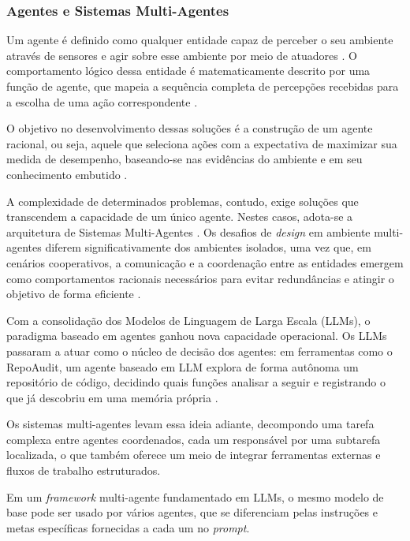 \documentclass[
    12pt,                %
    openright,           %
    oneside,             %
    a4paper,             %
    english,             %
    brazil               %
]{abntex2}
\begin{document}
\subsubsection{Agentes e Sistemas Multi-Agentes}
\label{sec:agentes}
\par
Um agente é definido como qualquer entidade capaz de perceber o seu ambiente através de sensores e agir sobre esse ambiente por meio de atuadores \cite{russell2020artificial}.
O comportamento lógico dessa entidade é matematicamente descrito por uma função de agente, que mapeia a sequência completa de percepções recebidas para a escolha de uma ação correspondente \cite{russell2020artificial}.
\par
O objetivo no desenvolvimento dessas soluções é a construção de um agente racional, ou seja, aquele que seleciona ações com a expectativa de maximizar sua medida de desempenho, baseando-se nas evidências do ambiente e em seu conhecimento embutido \cite{russell2020artificial}.
\par
A complexidade de determinados problemas, contudo, exige soluções que transcendem a capacidade de um único agente.
Nestes casos, adota-se a arquitetura de Sistemas Multi-Agentes \cite{russell2020artificial}.
Os desafios de \textit{design} em ambiente multi-agentes diferem significativamente dos ambientes isolados, uma vez que, em cenários cooperativos, a comunicação e a coordenação entre as entidades emergem como comportamentos racionais necessários para evitar redundâncias e atingir o objetivo de forma eficiente \cite{russell2020artificial}.
\par
Com a consolidação dos Modelos de Linguagem de Larga Escala (LLMs), o paradigma baseado em agentes ganhou nova capacidade operacional.
Os LLMs passaram a atuar como o núcleo de decisão dos agentes: em ferramentas como o RepoAudit, um agente baseado em LLM explora de forma autônoma um repositório de código, decidindo quais funções analisar a seguir e registrando o que já descobriu em uma memória própria \cite{guo2025repoaudit}.
\par
Os sistemas multi-agentes levam essa ideia adiante, decompondo uma tarefa complexa entre agentes coordenados, cada um responsável por uma subtarefa localizada, o que também oferece um meio de integrar ferramentas externas e fluxos de trabalho estruturados.
\par
Em um \textit{framework} multi-agente fundamentado em LLMs, o mesmo modelo de base pode ser usado por vários agentes, que se diferenciam pelas instruções e metas específicas fornecidas a cada um no \textit{prompt}.
\end{document}
